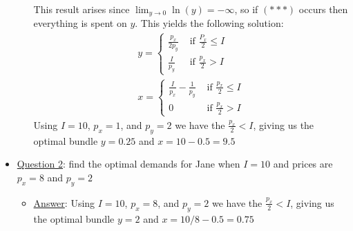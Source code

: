 \documentclass{article}
\begin{document}
\begin{itemize}
\begin{itemize}
    This result arises since $\lim_{y \rightarrow 0} \ln(y) = -\infty$, so if $(***)$ occurs then everything is spent on $y$. This yields the following solution:
    \begin{gather*}
      y =
      \begin{cases}
        \frac{p_{x}}{2p_{y}} & \text{ if } \frac{P_{x}}{2} \leq I \\
        \frac{I}{p_{y}} & \text{ if } \frac{p_{x}}{2} > I
       \end{cases}
      \\
      x =
      \begin{cases}
        \frac{I}{p_{x}} - \frac{1}{p_{y}} & \text{ if } \frac{p_{x}}{2} \leq I \\
        0 & \text{ if } \frac{p_{x}}{2} > I
       \end{cases}
    \end{gather*}
    Using $I = 10$, $p_{x} = 1$, and $p_{y} = 2$ we have the $\tfrac{p_{x}}{2} < I$, giving us the optimal bundle $y = 0.25$ and $x = 10 - 0.5 = 9.5$
  \end{itemize}
  \item  \underline{Question 2}: find the optimal demands for Jane when $I = 10$ and prices are $p_{x} = 8$ and $p_{y} = 2$
  \begin{itemize}
    \item  \underline{Answer}: Using $I = 10$, $p_{x} = 8$, and $p_{y} = 2$ we have the $\tfrac{p_{x}}{2} < I$, giving us the optimal bundle $y = 2$ and $x = 10/8 - 0.5 = 0.75$
  \end{itemize}
\end{itemize}
\par
\vspace{6mm}
\end{document}
